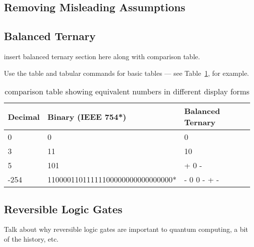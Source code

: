 \documentclass[a4paper]{article}
\begin{document}
\subsection{Removing Misleading Assumptions}
  

\subsection{Balanced Ternary} %
insert balanced ternary section here along with comparison table.


Use the table and tabular commands for basic tables --- see Table~\ref{tab:widgets}, for example.

\begin{table} %
	\centering
	\begin{tabular}{l|l|l} %
		Decimal & Binary (IEEE 754*) & Balanced Ternary \\\hline %
		0 & 0 & 0 \\
		3 & 11 & 10 \\
		5 & 101 & + 0 - \\
		-254 & 11000011011111100000000000000000* & - 0 0 - + - \\ %
	\end{tabular}
	\caption{\label{tab:widgets}comparison table showing equivalent numbers in different display forms}
\end{table}


\subsection{Reversible Logic Gates} %
Talk about why reversible logic gates are important to quantum computing, a bit of the history, etc.
\end{document}
